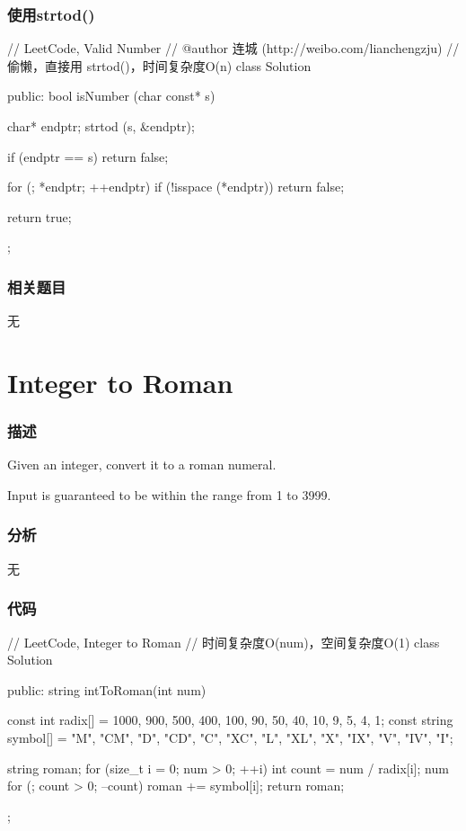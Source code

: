 \subsubsection{使用strtod()}
\begin{Code}
// LeetCode, Valid Number
// @author 连城 (http://weibo.com/lianchengzju)
// 偷懒，直接用 strtod()，时间复杂度O(n)
class Solution {
public:
    bool isNumber (char const* s) {
        char* endptr;
        strtod (s, &endptr);

        if (endptr == s) return false;

        for (; *endptr; ++endptr)
            if (!isspace (*endptr)) return false;

        return true;
    }
};
\end{Code}


\subsubsection{相关题目}
\begindot
\item 无
\myenddot


\section{Integer to Roman} %
\label{sec:integer-to-roman}


\subsubsection{描述}
Given an integer, convert it to a roman numeral.

Input is guaranteed to be within the range from 1 to 3999.


\subsubsection{分析}
无


\subsubsection{代码}
\begin{Code}
// LeetCode, Integer to Roman
// 时间复杂度O(num)，空间复杂度O(1)
class Solution {
public:
    string intToRoman(int num) {
        const int radix[] = {1000, 900, 500, 400, 100, 90,
                50, 40, 10, 9, 5, 4, 1};
        const string symbol[] = {"M", "CM", "D", "CD", "C", "XC",
                "L", "XL", "X", "IX", "V", "IV", "I"};

        string roman;
        for (size_t i = 0; num > 0; ++i) {
            int count = num / radix[i];
            num %
            for (; count > 0; --count) roman += symbol[i];
        }
        return roman;
    }
};
\end{Code}


